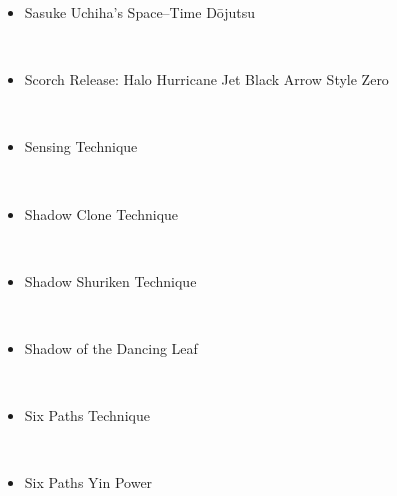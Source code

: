 \documentclass[a4paper,12pt]{article}
\begin{document}
\begin{itemize}
\item Sasuke Uchiha's Space–Time Dōjutsu
\end{itemize}\\ \par \vspace{0.5cm}

\begin{itemize}
\item Scorch Release: Halo Hurricane Jet Black Arrow Style Zero
\end{itemize}\\ \par \vspace{0.5cm}

\begin{itemize}
\item Sensing Technique
\end{itemize}\\ \par \vspace{0.5cm}

\begin{itemize}
\item Shadow Clone Technique
\end{itemize}\\ \par \vspace{0.5cm}

\begin{itemize}
\item Shadow Shuriken Technique
\end{itemize}\\ \par \vspace{0.5cm}

\begin{itemize}
\item Shadow of the Dancing Leaf
\end{itemize}\\ \par \vspace{0.5cm}

\begin{itemize}
\item Six Paths Technique
\end{itemize}\\ \par \vspace{0.5cm}

\begin{itemize}
\item Six Paths Yin Power
\end{itemize}\\ \par \vspace{0.5cm}
\end{document}
